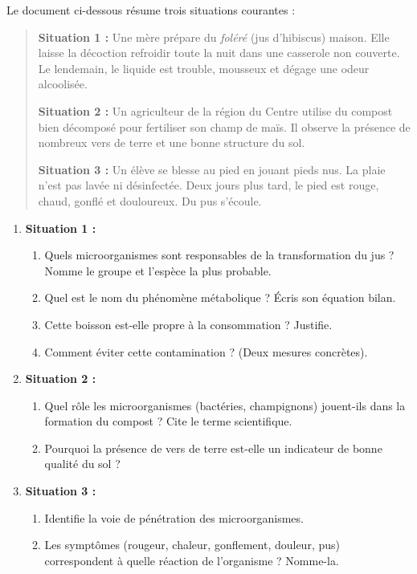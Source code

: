 \documentclass[11pt]{article}
\begin{document}
\begin{exercice}
Le document ci-dessous résume trois situations courantes :
\begin{quote}
\textbf{Situation 1 :} Une mère prépare du \emph{foléré} (jus d'hibiscus) maison. Elle laisse la décoction refroidir toute la nuit dans une casserole non couverte. Le lendemain, le liquide est trouble, mousseux et dégage une odeur alcoolisée.

\textbf{Situation 2 :} Un agriculteur de la région du Centre utilise du compost bien décomposé pour fertiliser son champ de maïs. Il observe la présence de nombreux vers de terre et une bonne structure du sol.

\textbf{Situation 3 :} Un élève se blesse au pied en jouant pieds nus. La plaie n'est pas lavée ni désinfectée. Deux jours plus tard, le pied est rouge, chaud, gonflé et douloureux. Du pus s'écoule.
\end{quote}
\begin{enumerate}
\item \textbf{Situation 1 :}
      \begin{enumerate}
      \item Quels microorganismes sont responsables de la transformation du jus ? Nomme le groupe et l'espèce la plus probable.
      \item Quel est le nom du phénomène métabolique ? Écris son équation bilan.
      \item Cette boisson est-elle propre à la consommation ? Justifie.
      \item Comment éviter cette contamination ? (Deux mesures concrètes).
      \end{enumerate}
\item \textbf{Situation 2 :}
      \begin{enumerate}
      \item Quel rôle les microorganismes (bactéries, champignons) jouent-ils dans la formation du compost ? Cite le terme scientifique.
      \item Pourquoi la présence de vers de terre est-elle un indicateur de bonne qualité du sol ?
      \end{enumerate}
\item \textbf{Situation 3 :}
      \begin{enumerate}
      \item Identifie la voie de pénétration des microorganismes.
      \item Les symptômes (rougeur, chaleur, gonflement, douleur, pus) correspondent à quelle réaction de l'organisme ? Nomme-la.

\end{enumerate}
\end{enumerate}
\end{exercice}
\end{document}
